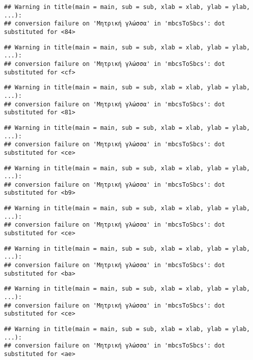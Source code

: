 \documentclass[
]{article}
\begin{document}
\begin{verbatim}
## Warning in title(main = main, sub = sub, xlab = xlab, ylab = ylab, ...):
## conversion failure on 'Μητρική γλώσσα' in 'mbcsToSbcs': dot substituted for <84>
\end{verbatim}

\begin{verbatim}
## Warning in title(main = main, sub = sub, xlab = xlab, ylab = ylab, ...):
## conversion failure on 'Μητρική γλώσσα' in 'mbcsToSbcs': dot substituted for <cf>
\end{verbatim}

\begin{verbatim}
## Warning in title(main = main, sub = sub, xlab = xlab, ylab = ylab, ...):
## conversion failure on 'Μητρική γλώσσα' in 'mbcsToSbcs': dot substituted for <81>
\end{verbatim}

\begin{verbatim}
## Warning in title(main = main, sub = sub, xlab = xlab, ylab = ylab, ...):
## conversion failure on 'Μητρική γλώσσα' in 'mbcsToSbcs': dot substituted for <ce>
\end{verbatim}

\begin{verbatim}
## Warning in title(main = main, sub = sub, xlab = xlab, ylab = ylab, ...):
## conversion failure on 'Μητρική γλώσσα' in 'mbcsToSbcs': dot substituted for <b9>
\end{verbatim}

\begin{verbatim}
## Warning in title(main = main, sub = sub, xlab = xlab, ylab = ylab, ...):
## conversion failure on 'Μητρική γλώσσα' in 'mbcsToSbcs': dot substituted for <ce>
\end{verbatim}

\begin{verbatim}
## Warning in title(main = main, sub = sub, xlab = xlab, ylab = ylab, ...):
## conversion failure on 'Μητρική γλώσσα' in 'mbcsToSbcs': dot substituted for <ba>
\end{verbatim}

\begin{verbatim}
## Warning in title(main = main, sub = sub, xlab = xlab, ylab = ylab, ...):
## conversion failure on 'Μητρική γλώσσα' in 'mbcsToSbcs': dot substituted for <ce>
\end{verbatim}

\begin{verbatim}
## Warning in title(main = main, sub = sub, xlab = xlab, ylab = ylab, ...):
## conversion failure on 'Μητρική γλώσσα' in 'mbcsToSbcs': dot substituted for <ae>
\end{verbatim}
\end{document}
